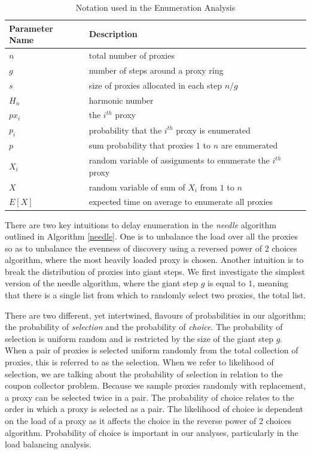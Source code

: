 \begin{table}[h]
  \centering
	\begin{tabular}{ll}
	\hline
	\cline{1-2}
	Parameter Name    & Description  \\
	\hline
    $n$     & total number of proxies \\
	$g$     & number of steps around a proxy ring  \\
	$s$     & size of proxies allocated in each step $n/g$ \\
    $H_n$   & harmonic number \\
    $px_i$  & the $i^{th}$ proxy \\
    $p_i$   & probability that the $i^{th}$ proxy is enumerated \\
    $p$     & sum probability that proxies $1$ to $n$ are enumerated \\
    $X_i$   & random variable of assignments to enumerate the $i^{th}$ proxy \\
    $X$     & random variable of sum of $X_i$ from $1$ to $n$ \\
    $E[X]$  & expected time on average to enumerate all proxies \\
	\hline
	\end{tabular}
  \caption{Notation used in the Enumeration Analysis}
  \label{tab:vars}
\end{table}

There are two key intuitions to delay enumeration in the \textit{needle} algorithm outlined in Algorithm \ref{needle}. One is to unbalance the load over all the proxies so as to unbalance the evenness of discovery using a reversed power of 2 choices algorithm, where the most heavily loaded proxy is chosen. Another intuition is to break the distribution of proxies into giant steps. We first investigate the simplest version of the needle algorithm, where the giant step $g$ is equal to $1$, meaning that there is a single list from which to randomly select two proxies, the total list.

There are two different, yet intertwined, flavours of probabilities in our algorithm; the probability of \textit{selection} and the probability of \textit{choice}. The probability of selection is uniform random and is restricted by the size of the giant step $g$. When a pair of proxies is selected uniform randomly from the total collection of proxies, this is referred to as the selection. When we refer to likelihood of selection, we are talking about the probability of selection in relation to the coupon collector problem. Because we sample proxies randomly with replacement, a proxy can be selected twice in a pair. The probability of choice relates to the order in which a proxy is selected as a pair. The likelihood of choice is dependent on the load of a proxy as it affects the choice in the reverse power of 2 choices algorithm. Probability of choice is important in our analyses, particularly in the load balancing analysis.

